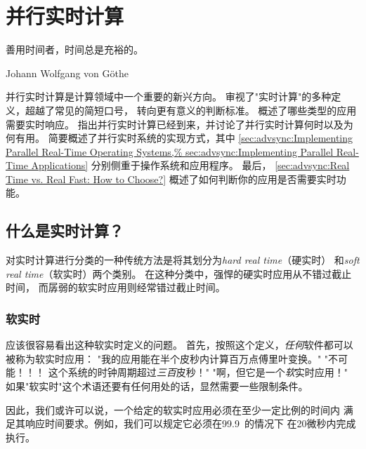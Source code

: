 
\section{并行实时计算}
\label{sec:advsync:Parallel Real-Time Computing}
%
\epigraph{善用时间者，时间总是充裕的。}
	 {Johann Wolfgang von G\"othe}

并行实时计算是计算领域中一个重要的新兴方向。
审视了"实时计算"的多种定义，超越了常见的简短口号，
转向更有意义的判断标准。
概述了哪些类型的应用需要实时响应。
指出并行实时计算已经到来，并讨论了并行实时计算何时以及为何有用。
简要概述了并行实时系统的实现方式，其中
\cref{sec:advsync:Implementing Parallel Real-Time Operating Systems,%
sec:advsync:Implementing Parallel Real-Time Applications}
分别侧重于操作系统和应用程序。
最后，
\cref{sec:advsync:Real Time vs. Real Fast: How to Choose?}
概述了如何判断你的应用是否需要实时功能。

\subsection{什么是实时计算？}
\label{sec:advsync:What is Real-Time Computing?}

对实时计算进行分类的一种传统方法是将其划分为\emph{hard real time}（硬实时）
和\emph{soft real time}（软实时）两个类别。
在这种分类中，强悍的硬实时应用从不错过截止时间，
而孱弱的软实时应用则经常错过截止时间。

\subsubsection{软实时}
\label{sec:Soft Real Time}

应该很容易看出这种软实时定义的问题。
首先，按照这个定义，\emph{任何}软件都可以被称为软实时应用：
"我的应用能在半个皮秒内计算百万点傅里叶变换。"
"不可能！！！
这个系统的时钟周期超过\emph{三百}皮秒！"
"啊，但它是一个\emph{软}实时应用！"
如果"软实时"这个术语还要有任何用处的话，显然需要一些限制条件。

因此，我们或许可以说，一个给定的软实时应用必须在至少一定比例的时间内
满足其响应时间要求。例如，我们可以规定它必须在99.9\pct\ 的情况下
在20微秒内完成执行。


